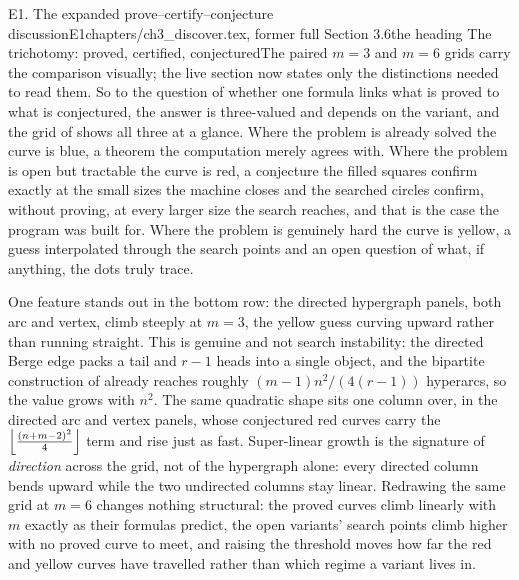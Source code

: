 \begin{offcut}{E1. The expanded prove--certify--conjecture discussion}{E1}{chapters/ch3\_discover.tex, former full Section 3.6}{the heading The trichotomy: proved, certified, conjectured}{The paired $m=3$ and $m=6$ grids carry the comparison visually; the live section now states only the distinctions needed to read them.}
So to the question of whether one formula links what is proved to what is conjectured, the answer is three-valued and depends on the variant, and the grid of  shows all three at a glance. Where the problem is already solved the curve is blue, a theorem the computation merely agrees with. Where the problem is open but tractable the curve is red, a conjecture the filled squares confirm exactly at the small sizes the machine closes and the searched circles confirm, without proving, at every larger size the search reaches, and that is the case the program was built for. Where the problem is genuinely hard the curve is yellow, a guess interpolated through the search points and an open question of what, if anything, the dots truly trace.

One feature stands out in the bottom row: the directed hypergraph panels, both arc and vertex, climb steeply at $m = 3$, the yellow guess curving upward rather than running straight. This is genuine and not search instability: the directed Berge edge packs a tail and $r-1$ heads into a single object, and the bipartite construction of  already reaches roughly $(m-1)n^2/(4(r-1))$ hyperarcs, so the value grows with $n^2$. The same quadratic shape sits one column over, in the directed arc and vertex panels, whose conjectured red curves carry the $\left\lfloor \frac{(n+m-2)^2}{4} \right\rfloor$ term and rise just as fast. Super-linear growth is the signature of \emph{direction} across the grid, not of the hypergraph alone: every directed column bends upward while the two undirected columns stay linear. Redrawing the same grid at $m = 6$ changes nothing structural: the proved curves climb linearly with $m$ exactly as their formulas predict, the open variants' search points climb higher with no proved curve to meet, and raising the threshold moves how far the red and yellow curves have travelled rather than which regime a variant lives in.


\end{offcut}
